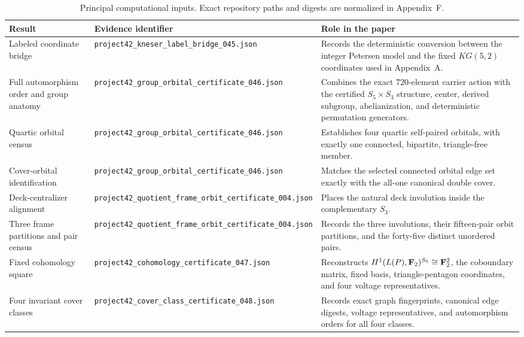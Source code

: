 \begin{table}[h]
\centering
\begin{tabularx}{\textwidth}{lXX}
\toprule
Result & Evidence identifier & Role in the paper\\
\midrule

Labeled coordinate bridge
&
\texttt{project42\_kneser\_label\_bridge\_045.json}
&
Records the deterministic conversion between the integer Petersen model
and the fixed \(KG(5,2)\) coordinates used in Appendix~A.\\

Full automorphism order and group anatomy
&
\texttt{project42\_group\_orbital\_certificate\_046.json}
&
Combines the exact \(720\)-element carrier action with the certified
\(S_5\times S_3\) structure, center, derived subgroup, abelianization,
and deterministic permutation generators.\\

Quartic orbital census
&
\texttt{project42\_group\_orbital\_certificate\_046.json}
&
Establishes four quartic self-paired orbitals, with exactly one connected,
bipartite, triangle-free member.\\

Cover-orbital identification
&
\texttt{project42\_group\_orbital\_certificate\_046.json}
&
Matches the selected connected orbital edge set exactly with the all-one
canonical double cover.\\

Deck-centralizer alignment
&
\texttt{project42\_quotient\_frame\_orbit\_certificate\_004.json}
&
Places the natural deck involution inside the complementary \(S_3\).\\

Three frame partitions and pair census
&
\texttt{project42\_quotient\_frame\_orbit\_certificate\_004.json}
&
Records the three involutions, their fifteen-pair orbit partitions, and
the forty-five distinct unordered pairs.\\

Fixed cohomology square
&
\texttt{project42\_cohomology\_certificate\_047.json}
&
Reconstructs
\(H^1(L(P),\mathbf F_2)^{S_5}\cong\mathbf F_2^2\), the coboundary matrix, fixed basis,
triangle-pentagon coordinates, and four voltage representatives.\\

Four invariant cover classes
&
\texttt{project42\_cover\_class\_certificate\_048.json}
&
Records exact graph fingerprints, canonical edge digests, voltage
representatives, and automorphism orders for all four classes.\\

\bottomrule
\end{tabularx}
\caption{Principal computational inputs. Exact repository paths and
digests are normalized in Appendix~F.}
\label{tab:certificate-ledger}
\end{table}

